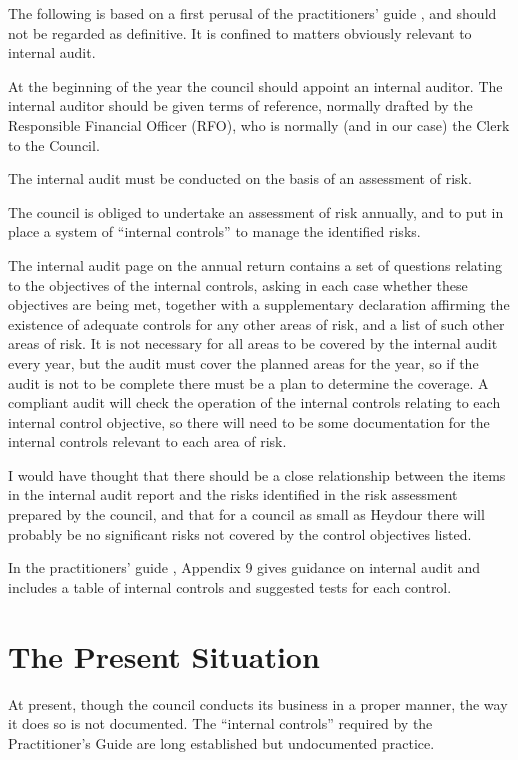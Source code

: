 \documentclass[numreferences]{rbjk}
\begin{document}
\begin{article}
The following is based on a first perusal of the practitioners' guide \cite{JPAG08}, and should not be regarded as definitive.
It is confined to matters obviously relevant to internal audit.

At the beginning of the year the council should appoint an internal auditor.
The internal auditor should be given terms of reference, normally drafted by the Responsible Financial Officer (RFO), who is normally (and in our case) the Clerk to the Council.

The internal audit must be conducted on the basis of an assessment of risk.

The council is obliged to undertake an assessment of risk annually, and to put in place a system of ``internal controls'' to manage the identified risks.

The internal audit page on the annual return contains a set of questions relating to the objectives of the internal controls, asking in each case whether these objectives are being met, together with a supplementary declaration affirming the existence of adequate controls for any other areas of risk, and a list of such other areas of risk.
It is not necessary for all areas to be covered by the internal audit every year, but the audit must cover the planned areas for the year, so if the audit is not to be complete there must be a plan to determine the coverage.
A compliant audit will check the operation of the internal controls relating to each internal control objective, so there will need to be some documentation for the internal controls relevant to each area of risk.

I would have thought that there should be a close relationship between the items in the internal audit report and the risks identified in the risk assessment prepared by the council, and that for a council as small as Heydour there will probably be no significant risks not covered by the control objectives listed.

In the practitioners' guide \cite{JPAG08}, Appendix 9 gives guidance on internal audit and includes a table of internal controls and suggested tests for each control.

\section{The Present Situation}

At present, though the council conducts its business in a proper manner, the way it does so is not documented.
The ``internal controls'' required by the Practitioner's Guide are long established but undocumented practice.


\end{article}
\end{document}
